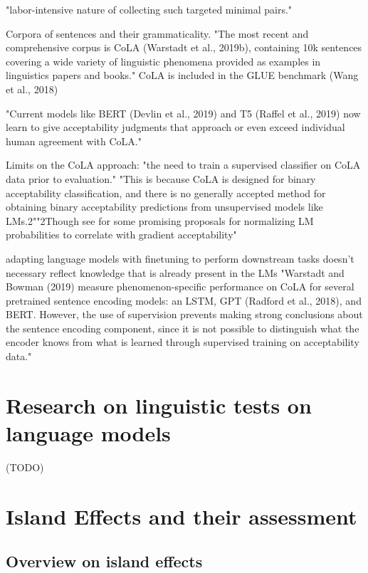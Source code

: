 "labor-intensive nature of collecting such targeted minimal pairs." \citep{warstadt2020blimp}	


Corpora of sentences and their grammaticality. "The most recent
and comprehensive corpus is CoLA (Warstadt et al., 2019b), containing 10k sentences covering a wide variety of linguistic phenomena provided as examples in linguistics papers and books."\citep{warstadt2020blimp}	
CoLA is included in the GLUE benchmark (Wang et al., 2018)

"Current models like BERT (Devlin et al., 2019) and T5 (Raffel et al., 2019) now learn to give acceptability judgments that approach or even exceed individual human agreement with CoLA." \citep{warstadt2020blimp}	

Limits on the CoLA approach: "the need to train a supervised classifier on CoLA data prior to evaluation." \citep{warstadt2020blimp}	
"This is because CoLA is designed for binary acceptability classification, and there is no generally accepted method for obtaining binary acceptability predictions from unsupervised
models like LMs.2""2Though see \citet{lau2017grammaticality} for some promising proposals for normalizing LM probabilities to correlate with gradient acceptability" \citep{warstadt2020blimp}	

adapting language models with finetuning to perform downstream tasks doesn’t necessary
reflect knowledge that is already present in the LMs  \citep{warstadt2020blimp}
"Warstadt and Bowman (2019)
measure phenomenon-specific performance on
CoLA for several pretrained sentence encoding
models: an LSTM, GPT (Radford et al., 2018),
and BERT. However, the use of supervision
prevents making strong conclusions about the
sentence encoding component, since it is not
possible to distinguish what the encoder knows
from what is learned through supervised training
on acceptability data." \citep{warstadt2020blimp}


\section{Research on linguistic tests on language models}
(TODO)


\section{Island Effects and their assessment}

\subsection{Overview on island effects}

